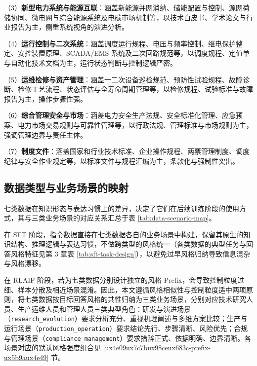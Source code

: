 \documentclass[fontset=fandol,type=master,campus=shenzhen,etitleauto=true]{hithesisbook}
\begin{document}
\noindent （3）\textbf{新型电力系统与能源互联}：涵盖新能源并网消纳、储能配置与控制、源网荷储协同、微电网与综合能源系统及电碳市场机制等，以技术白皮书、学术论文与行业报告为主，侧重系统视角的演进分析。

\noindent （4）\textbf{运行控制与二次系统}：涵盖调度运行规程、电压与频率控制、继电保护整定、安控装置原理、SCADA/EMS 系统及二次回路规范等，以调度规程、定值单与自动化技术文档为主，运行状态判断与控制逻辑严密。

\noindent （5）\textbf{运维检修与资产管理}：涵盖一二次设备巡检规范、预防性试验规程、故障诊断、检修工艺流程、状态评估与全寿命周期管理等，以检修规程、试验标准与故障报告为主，操作步骤性强。

\noindent （6）\textbf{综合管理安全与市场}：涵盖电力安全生产法规、安全标准化管理、应急预案、电力市场交易规则与可靠性管理等，以行政法规、管理标准与市场规则为主，强调管理边界与责任主体。

\noindent （7）\textbf{制度文件}：涵盖国家和行业技术标准、企业操作规程、两票管理制度、调度纪律与安全作业规定等，以标准文件与规程汇编为主，条款化与强制性突出。

\subsection{数据类型与业务场景的映射}\label{subsec:data-mapping}

七类数据在知识形态与表达习惯上的差异，决定了它们在后续训练阶段的使用方式，其与三类业务场景的对应关系汇总于表 \ref{tab:data-scenario-map}。

在 SFT 阶段，指令数据直接在七类数据各自的业务场景中构建，保留其原生的知识结构、推理逻辑与表达习惯，不做跨类型的风格统一（各类数据的典型任务与回答风格特征见第 3 章表 \ref{tab:sft-task-design}），以避免过早风格归纳导致信息混杂与风格漂移。

在 RLAIF 阶段，若为七类数据分别设计独立的风格 Prefix，会导致控制粒度过细、样本分散及相近场景混淆。因此，本文遵循风格相似性与控制粒度适中两项原则，将七类数据按目标回答风格的共性归纳为三类业务场景，分别对应技术研究人员、生产运维人员和管理人员三类典型角色：研发与演进场景（\texttt{research\_evolution}）要求分析充分、重视机理阐述与多维方案比较；生产与运行场景（\texttt{production\_operation}）要求结论先行、步骤清晰、风险优先；合规与管理场景（\texttt{compliance\_management}）要求措辞正式、依据明确、边界清晰。各场景对应的默认风格强度组合见 \ref{ux4e09ux7c7bux98ceux683c-prefix-ux5b9aux4e49} 节。
\end{document}
